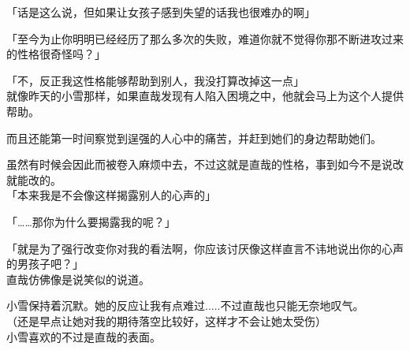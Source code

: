 「话是这么说，但如果让女孩子感到失望的话我也很难办的啊」

「至今为止你明明已经经历了那么多次的失败，难道你就不觉得你那不断进攻过来的性格很奇怪吗？」

「不，反正我这性格能够帮助到别人，我没打算改掉这一点」\\

就像昨天的小雪那样，如果直哉发现有人陷入困境之中，他就会马上为这个人提供帮助。

而且还能第一时间察觉到逞强的人心中的痛苦，并赶到她们的身边帮助她们。

虽然有时候会因此而被卷入麻烦中去，不过这就是直哉的性格，事到如今不是说改就能改的。\\

「本来我是不会像这样揭露别人的心声的」

「……那你为什么要揭露我的呢？」

「就是为了强行改变你对我的看法啊，你应该讨厌像这样直言不讳地说出你的心声的男孩子吧？」\\

直哉仿佛像是说笑似的说道。

小雪保持着沉默。她的反应让我有点难过.....不过直哉也只能无奈地叹气。\\

（还是早点让她对我的期待落空比较好，这样才不会让她太受伤）\\

小雪喜欢的不过是直哉的表面。

